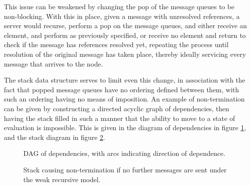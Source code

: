 This issue can be weakened by changing the pop of the message queues to be
non-blocking.
With this in place, given a message with unresolved references, a server would
recurse, perform a pop on the message queues, and either receive an element,
and perform as previously specified, or receive no element and return to check
if the message has references resolved yet, repeating the process until
resolution of the original message has taken place, thereby ideally servicing
every message that arrives to the node.

The stack data structure serves to limit even this change, in association with
the fact that popped message queues have no ordering defined between them, with
such an ordering having no means of imposition.
An example of non-termination can be given by constructing a directed acyclic
graph of dependencies, then having the stack filled in such a manner that the
ability to move to a state of evaluation is impossible.
This is given in the diagram of dependencies in figure \ref{fig:deps}, and the
stack diagram in figure \ref{fig:deps-block-stack}.

\begin{figure}
	\centering
	\caption{\label{fig:deps}DAG of dependencies, with arcs indicating
	direction of dependence.}
\end{figure}

\begin{figure}
	\centering
	\caption{\label{fig:deps-block-stack}Stack causing non-termination if
	no further messages are sent under the weak recursive model.} 
\end{figure}

